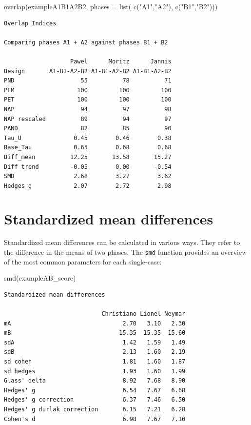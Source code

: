 \documentclass[
]{book}
\newenvironment{Shaded}{\begin{snugshade}}{\end{snugshade}}
\newcommand{\AttributeTok}[1]{\textcolor[rgb]{0.77,0.63,0.00}{#1}}
\newcommand{\FunctionTok}[1]{\textcolor[rgb]{0.00,0.00,0.00}{#1}}
\newcommand{\NormalTok}[1]{#1}
\newcommand{\StringTok}[1]{\textcolor[rgb]{0.31,0.60,0.02}{#1}}
\begin{document}
\begin{Shaded}
\begin{Highlighting}[]
\FunctionTok{overlap}\NormalTok{(exampleA1B1A2B2, }\AttributeTok{phases =} \FunctionTok{list}\NormalTok{( }\FunctionTok{c}\NormalTok{(}\StringTok{"A1"}\NormalTok{,}\StringTok{"A2"}\NormalTok{), }\FunctionTok{c}\NormalTok{(}\StringTok{"B1"}\NormalTok{,}\StringTok{"B2"}\NormalTok{)))}
\end{Highlighting}
\end{Shaded}

\begin{verbatim}
Overlap Indices

Comparing phases A1 + A2 against phases B1 + B2 

                   Pawel      Moritz      Jannis
Design       A1-B1-A2-B2 A1-B1-A2-B2 A1-B1-A2-B2
PND                   55          78          71
PEM                  100         100         100
PET                  100         100         100
NAP                   94          97          98
NAP rescaled          89          94          97
PAND                  82          85          90
Tau_U               0.45        0.46        0.38
Base_Tau            0.65        0.68        0.68
Diff_mean          12.25       13.58       15.27
Diff_trend         -0.05        0.00       -0.54
SMD                 2.68        3.27        3.62
Hedges_g            2.07        2.72        2.98
\end{verbatim}

\hypertarget{standardized-mean-differences}{%
\section{Standardized mean differences}\label{standardized-mean-differences}}

Standardized mean differences can be calculated in various ways. They refer to the difference in the means of two phases. The \texttt{smd} function provides an overview of the most common parameters for each single-case:

\begin{Shaded}
\begin{Highlighting}[]
\FunctionTok{smd}\NormalTok{(exampleAB\_score)}
\end{Highlighting}
\end{Shaded}

\begin{verbatim}
Standardized mean differences

                            Christiano Lionel Neymar
mA                                2.70   3.10   2.30
mB                               15.35  15.35  15.60
sdA                               1.42   1.59   1.49
sdB                               2.13   1.60   2.19
sd cohen                          1.81   1.60   1.87
sd hedges                         1.93   1.60   1.99
Glass' delta                      8.92   7.68   8.90
Hedges' g                         6.54   7.67   6.68
Hedges' g correction              6.37   7.46   6.50
Hedges' g durlak correction       6.15   7.21   6.28
Cohen's d                         6.98   7.67   7.10
\end{verbatim}
\end{document}
